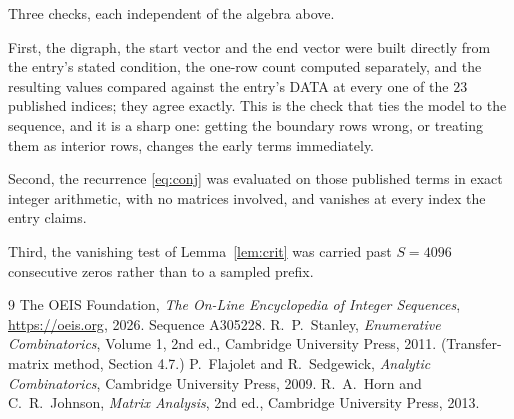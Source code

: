 \documentclass[11pt,a4paper]{article}
\theoremstyle{plain}
\theoremstyle{definition}
\begin{document}
Three checks, each independent of the algebra above.

First, the digraph, the start vector and the end vector were built directly from the
entry's stated condition, the one-row count computed separately, and the resulting values
compared against the entry's DATA at every one of the $23$ published indices; they
agree exactly. This is the check that ties the model to the sequence, and it is a sharp one:
getting the boundary rows wrong, or treating them as interior rows, changes the early terms
immediately.

Second, the recurrence \eqref{eq:conj} was evaluated on those published terms in exact
integer arithmetic, with no matrices involved, and vanishes at every index the entry claims.

Third, the vanishing test of Lemma~\ref{lem:crit} was carried past $S=4096$ consecutive
zeros rather than to a sampled prefix.

\begin{thebibliography}{9}
 The OEIS Foundation, \emph{The On-Line Encyclopedia of Integer
Sequences}, \url{https://oeis.org}, 2026. Sequence A305228.
 R.~P.~Stanley, \emph{Enumerative Combinatorics}, Volume 1, 2nd ed.,
Cambridge University Press, 2011. (Transfer-matrix method, Section 4.7.)
 P.~Flajolet and R.~Sedgewick, \emph{Analytic Combinatorics}, Cambridge
University Press, 2009.
 R.~A.~Horn and C.~R.~Johnson, \emph{Matrix Analysis}, 2nd ed., Cambridge
University Press, 2013.
\end{thebibliography}
\end{document}
